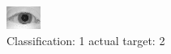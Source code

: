 \begin{figure}[h!]
\begin{center}
\includegraphics[width=0.60\columnwidth]{figures/ID1005_class_1_target_2.png}
\end{center}
\caption{ Classification: 1 actual target: 2}
\label{fig:ID1005_class_1_target_2}
\end{figure}
